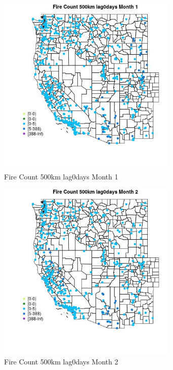 \begin{figure} 
\centering  
\includegraphics[width=0.77\textwidth]{Code_Outputs/Report_ML_input_PM25_Step4_part_e_de_duplicated_aves_compiled_2019-05-18wNAs_MapObsMo1Fire_Count_500km_lag0days.jpg} 
\caption{\label{fig:Report_ML_input_PM25_Step4_part_e_de_duplicated_aves_compiled_2019-05-18wNAsMapObsMo1Fire_Count_500km_lag0days}Fire Count 500km lag0days Month 1} 
\end{figure} 
 

\begin{figure} 
\centering  
\includegraphics[width=0.77\textwidth]{Code_Outputs/Report_ML_input_PM25_Step4_part_e_de_duplicated_aves_compiled_2019-05-18wNAs_MapObsMo2Fire_Count_500km_lag0days.jpg} 
\caption{\label{fig:Report_ML_input_PM25_Step4_part_e_de_duplicated_aves_compiled_2019-05-18wNAsMapObsMo2Fire_Count_500km_lag0days}Fire Count 500km lag0days Month 2} 
\end{figure} 
 

